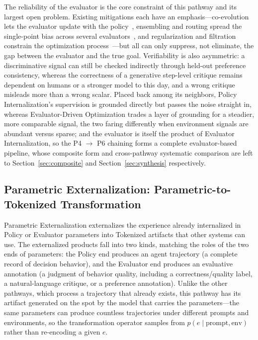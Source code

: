 The reliability of the evaluator is the core constraint of this pathway and its largest open problem. Existing mitigations each have an emphasis---co-evolution lets the evaluator update with the policy~\cite{Yua24, Wu24d, Li26l}, ensembling and routing spread the single-point bias across several evaluators~\cite{Wu25x, Xu24d}, and regularization and filtration constrain the optimization process~\cite{Ack26, She24c}---but all can only suppress, not eliminate, the gap between the evaluator and the true goal. Verifiability is also asymmetric: a discriminative signal can still be checked indirectly through held-out preference consistency, whereas the correctness of a generative step-level critique remains dependent on humans or a stronger model to this day, and a wrong critique misleads more than a wrong scalar. Placed back among its neighbors, Policy Internalization's supervision is grounded directly but passes the noise straight in, whereas Evaluator-Driven Optimization trades a layer of grounding for a steadier, more comparable signal, the two faring differently when environment signals are abundant versus sparse; and the evaluator is itself the product of Evaluator Internalization, so the P4 $\rightarrow$ P6 chaining forms a complete evaluator-based pipeline, whose composite form and cross-pathway systematic comparison are left to Section~\ref{sec:composite} and Section~\ref{sec:synthesis} respectively.

\subsection{Parametric Externalization: Parametric-to-Tokenized Transformation}
\label{sec:parametric-externalization}

Parametric Externalization externalizes the experience already internalized in Policy or Evaluator parameters into Tokenized artifacts that other systems can use. The externalized products fall into two kinds, matching the roles of the two ends of parameters: the Policy end produces an agent trajectory (a complete record of decision behavior), and the Evaluator end produces an evaluative annotation (a judgment of behavior quality, including a correctness/quality label, a natural-language critique, or a preference annotation). Unlike the other pathways, which process a trajectory that already exists, this pathway has its artifact generated on the spot by the model that carries the parameters---the same parameters can produce countless trajectories under different prompts and environments, so the transformation operator samples from $p(e \mid \text{prompt}, \text{env})$ rather than re-encoding a given $e$.

